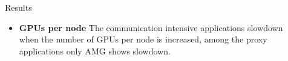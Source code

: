 \documentclass[final]{beamer}
\newlength{\onecolwid}
\newlength{\twocolwid}
\begin{document}
\begin{frame}[t]
\begin{columns}[t]
\begin{column}{\twocolwid}
\begin{columns}[t,totalwidth=\twocolwid]
\begin{column}{\onecolwid}
\begin{block}{Results}
\begin{itemize}
\item \textbf{GPUs per node} The communication intensive applications slowdown when the number of GPUs per node is increased, among the proxy applications only AMG shows slowdown.
\end{itemize}
\end{block}


\end{column} %

\begin{column}{\onecolwid} %
\vspace{-1em}




\end{column}
\end{columns}
\end{column}
\end{columns}
\end{frame}
\end{document}
